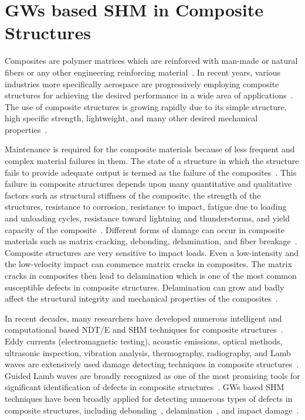 \documentclass[b5paper, 11pt, titlepage]{book}
\begin{document}
\section{GWs based SHM in Composite Structures}
Composites are polymer matrices which are reinforced with man-made or natural fibers or any other engineering reinforcing material~\cite{jawaid2018structural, Rahul2018}. In recent years, various industries more specifically aerospace are progressively employing composite structures for achi\-eving the desired performance in a wide area of applications~\cite{jawaid2018structural}. The use of composite structures is growing rapidly due to its simple structure, high specific strength, lightweight, and many other desired mechanical properties~\cite{jawaid2018structural, Radzienski2019}. 

Maintenance is required for the composite materials because of less frequent and complex material failures in them. The state of a structure in which the structure fails to provide adequate output is termed as the failure of the composites~\cite{Rahul2018}. This failure in composite structures depends upon many quantitative and qualitative factors such as structural stiffness of the composite, the strength of the structures, resistance to corrosion, resistance to impact, fatigue due to loading and unloading cycles, resistance toward lightning and thunderstorms, and yield capacity of the composite~\cite{Rahul2018}. Different forms of damage can occur in composite materials such as matrix cracking, debonding, delamination, and fiber breakage~\cite{stepinski2013advanced, Rahul2018, yu2019core, Fakih2019}. Composite structures are very sensitive to impact loads. Even a low-intensity and the low-velocity impact can commence matrix cracks in composites. The matrix cracks in composites then lead to delamination which is one of the most common susceptible defects in composite structures. Delamination can grow and badly affect the structural integrity and mechanical properties of the composites~\cite{Munian2018}. 

In recent decades, many researchers have developed numerous intelligent and computational based NDT/E and SHM techniques for composite structures~\cite{gomes2018use}. Eddy currents (electromagnetic testing), acoustic emissions, optical methods, ultrasonic inspection, vibration analysis, thermography, radiography, and Lamb waves are extensively used damage detecting techniques in composite structures~\cite{Rahul2018, gomes2018use}. Guided Lamb waves are broadly recognized as one of the most promising tools for significant identification of defects in composite structures~\cite{stepinski2013advanced, Kessler2002, Ricci2016}. GWs based SHM techniques have been broadly applied for detecting numerous types of defects in composite structures, including debonding~\cite{Sikdar2019}, delamination~\cite{Tian2015,Park2014}, and impact damage~\cite{Girolamo2018,Rogge2013,Kudela2018}. 
\end{document}
